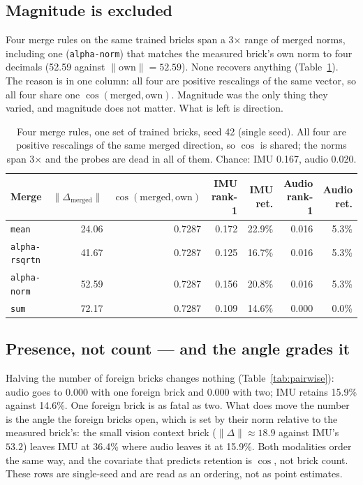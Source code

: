 \documentclass[11pt]{article}
\begin{document}
\subsection{Magnitude is excluded}
Four merge rules on the same trained bricks span a 3$\times$ range of merged norms, including one (\texttt{alpha-norm}) that matches the measured brick's own norm to four decimals (52.59 against $\|\mathrm{own}\| = 52.59$). None recovers anything (Table~\ref{tab:merges}). The reason is in one column: all four are positive rescalings of the same vector, so all four share one $\cos(\mathrm{merged}, \mathrm{own})$. Magnitude was the only thing they varied, and magnitude does not matter. What is left is direction.

\begin{table}[t]
\centering
\caption{Four merge rules, one set of trained bricks, seed 42 (single seed). All four are positive rescalings of the same merged direction, so $\cos$ is shared; the norms span 3$\times$ and the probes are dead in all of them. Chance: IMU 0.167, audio 0.020.}
\label{tab:merges}
\small
\begin{tabular}{lrrrrrr}
\toprule
Merge & $\|\Delta_{\mathrm{merged}}\|$ & $\cos(\mathrm{merged}, \mathrm{own})$ & IMU rank-1 & IMU ret. & Audio rank-1 & Audio ret. \\
\midrule
\texttt{mean} & 24.06 & 0.7287 & 0.172 & 22.9\% & 0.016 & 5.3\% \\
\texttt{alpha-rsqrtn} & 41.67 & 0.7287 & 0.125 & 16.7\% & 0.016 & 5.3\% \\
\texttt{alpha-norm} & 52.59 & 0.7287 & 0.156 & 20.8\% & 0.016 & 5.3\% \\
\texttt{sum} & 72.17 & 0.7287 & 0.109 & 14.6\% & 0.000 & 0.0\% \\
\bottomrule
\end{tabular}
\end{table}

\subsection{Presence, not count --- and the angle grades it}
Halving the number of foreign bricks changes nothing (Table~\ref{tab:pairwise}): audio goes to 0.000 with one foreign brick and 0.000 with two; IMU retains 15.9\% against 14.6\%. One foreign brick is as fatal as two. What does move the number is the angle the foreign bricks open, which is set by their norm relative to the measured brick's: the small vision context brick ($\|\Delta\| \approx 18.9$ against IMU's $53.2$) leaves IMU at 36.4\% where audio leaves it at 15.9\%. Both modalities order the same way, and the covariate that predicts retention is $\cos$, not brick count. These rows are single-seed and are read as an ordering, not as point estimates.
\end{document}
